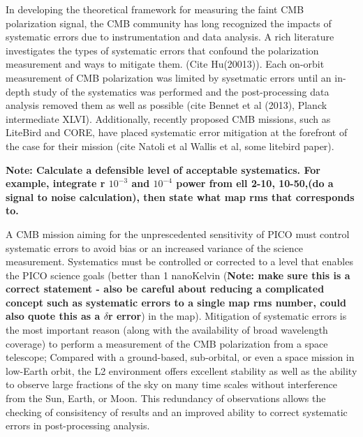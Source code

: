 \documentclass[PICOReport.tex]{subfiles}
\begin{document}
In developing the theoretical framework for measuring the faint CMB
polarization signal, the CMB community has long recognized the impacts
of systematic errors due to instrumentation and data analysis.   A rich literature investigates the types of
systematic errors that confound the polarization measurement and ways
to mitigate them. (Cite Hu(20013)).
Each on-orbit measurement of CMB polarization was limited by
sysetmatic errors until an in-depth study of the systematics was
performed and the post-processing data analysis removed them as well
as possible (cite Bennet et al (2013), Planck intermediate XLVI).
Additionally, recently proposed CMB missions, such as LiteBird and CORE, have placed
systematic error mitigation at the forefront of the case for their
mission (cite Natoli et al Wallis et al, some litebird paper).

\textbf{Note: Calculate a defensible level of acceptable systematics.
For example, integrate r $10^{-3}$ and $10^{-4}$ power from ell 2-10, 10-50,(do a signal to
noise calculation), then state what map rms that corresponds to.  }

A CMB mission aiming for the unprescedented sensitivity of PICO must control
systematic errors to avoid bias or an increased variance of the
science measurement.   
Systematics must be controlled or corrected to a level that enables the PICO
science goals (better than 1 nanoKelvin (\textbf{Note: make sure this is a
  correct statement - also be careful about reducing a complicated
  concept such as systematic errors to a single map rms number, could also
  quote this as a $\delta$r error}) in the map).
Mitigation of systematic errors is the most important reason (along
with the availability of broad wavelength coverage) to perform a
measurement of the CMB polarization from a space telescope; Compared
with a ground-based, sub-orbital, or even a space mission in 
low-Earth orbit, the L2 environment offers excellent stability as well
as the ability to observe large fractions of the sky on many time
scales without interference from the Sun, Earth, or Moon.
This redundancy of observations allows the checking of consisitency of
results and an improved ability to correct systematic errors in
post-processing analysis.
\end{document}
